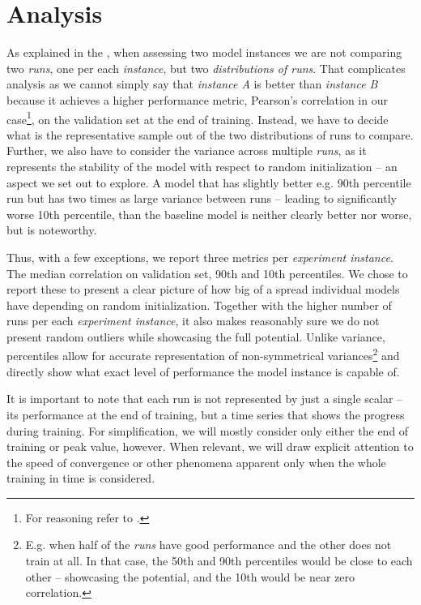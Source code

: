 \section{Analysis}\label{ch:4.3.1}

As explained in the , when assessing two model instances we are not comparing two \textit{runs}, one per each \textit{instance}, but two \textit{distributions of runs}. That complicates analysis as we cannot simply say that \textit{instance A} is better than \textit{instance B} because it achieves a higher performance metric, Pearson’s correlation in our case\footnote{For reasoning refer to .}, on the validation set at the end of training. Instead, we have to decide what is the representative sample out of the two distributions of runs to compare. Further, we also have to consider the variance across multiple \textit{runs}, as it represents the stability of the model with respect to random initialization -- an aspect we set out to explore. A model that has slightly better e.g. 90th percentile run but has two times as large variance between runs -- leading to significantly worse 10th percentile, than the baseline model is neither clearly better nor worse, but is noteworthy. 

Thus, with a few exceptions, we report three metrics per \textit{experiment instance}. The median correlation on validation set, 90th and 10th percentiles. We chose to report these to present a clear picture of how big of a spread individual models have depending on random initialization. Together with the higher number of runs per each \textit{experiment instance}, it also makes reasonably sure we do not present random outliers while showcasing the full potential. Unlike variance, percentiles allow for accurate representation of non-symmetrical variances\footnote{E.g. when half of the \textit{runs} have good performance and the other does not train at all. In that case, the 50th and 90th percentiles would be close to each other -- showcasing the potential, and the 10th would be near zero correlation.} and directly show what exact level of performance the model instance is capable of.

It is important to note that each run is not represented by just a single scalar -- its performance at the end of training, but a time series that shows the progress during training. For simplification, we will mostly consider only either the end of training or peak value, however. When relevant, we will draw explicit attention to the speed of convergence or other phenomena apparent only when the whole training in time is considered.

